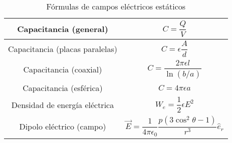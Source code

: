 \documentclass[10pt,conference]{IEEEtran}
\numberwithin{table}{section}
\begin{document}
\begin{table}[H]
{\begin{tabular}{|c|c|}
            \hline
            Capacitancia (general)          & $C = \dfrac{Q}{V}$                                                                     \\
            \hline
            Capacitancia (placas paralelas) & $C = \epsilon \dfrac{A}{d}$                                                            \\
            \hline
            Capacitancia (coaxial)          & $C = \dfrac{2 \pi \epsilon l}{\ln(b/a)}$                                               \\
            \hline
            Capacitancia (esférica)         & $C = 4 \pi \epsilon a$                                                                 \\
            \hline
            Densidad de energía eléctrica   & $W_e = \dfrac{1}{2} \epsilon E^2$                                                      \\
            \hline
            Dipolo eléctrico (campo)        & $\vec{E} = \dfrac{1}{4 \pi \epsilon_0} \dfrac{p (3 \cos^2 \theta - 1)}{r^3} \hat{e}_r$ \\
            \hline
        \end{tabular}
    }
    \caption{Fórmulas de campos eléctricos estáticos}
\end{table}
\end{document}
